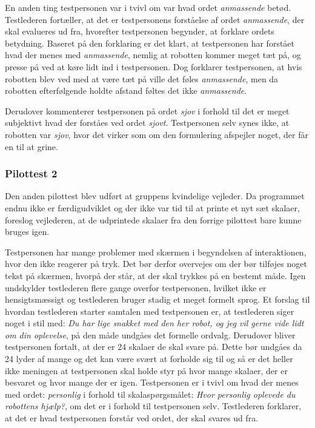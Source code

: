 En anden ting testpersonen var i tvivl om var hvad ordet \textit{anmassende} betød. Testlederen fortæller, at det er testpersonens forståelse af ordet \textit{anmassende}, der skal evalueres ud fra, hvorefter testpersonen begynder, at forklare ordets betydning. Baseret på den forklaring er det klart, at testpersonen har forstået hvad der menes med \textit{anmassende}, nemlig at robotten kommer meget tæt på, og presse på ved at køre lidt ind i testpersonen. Dog forklarer testpersonen, at hvis robotten blev ved med at være tæt på ville det føles \textit{anmassende}, men da robotten efterfølgende holdte afstand føltes det ikke \textit{anmassende}.

Derudover kommenterer testpersonen på ordet \textit{sjov} i forhold til det er meget subjektivt hvad der forståes ved ordet \textit{sjovt}. Testpersonen selv synes ikke, at robotten var \textit{sjov}, hvor det virker som om den formulering afspejler noget, der får en til at grine.

\subsubsection*{Pilottest 2}
\label{TestAfSkalaerPilot2}
%
Den anden pilottest blev udført at gruppens kvindelige vejleder. Da programmet endnu ikke er færdigudviklet og der ikke var tid til at printe et nyt sæt skalaer, foreslog vejlederen, at de udprintede skalaer fra den forrige pilottest bare kunne bruges igen. 

Testpersonen har mange problemer med skærmen i begyndelsen af interaktionen, hvor den ikke reagerer på tryk. Det bør derfor overvejes om der bør tilføjes noget tekst på skærmen, hvorpå der står, at der skal trykkes på en bestemt måde. Igen undskylder testlederen flere gange overfor testpersonen, hvilket ikke er hensigtsmæssigt og testlederen bruger stadig et meget formelt sprog. Et forslag til hvordan testlederen starter samtalen med testpersonen er, at testlederen siger noget i stil med: \textit{Du har lige snakket med den her robot, og jeg vil gerne vide lidt om din oplevelse}, på den måde undgåes det formelle ordvalg. Derudover bliver testpersonen fortalt, at der er 24 skalaer de skal svare på. Dette bør undgåes da 24 lyder af mange og det kan være svært at forholde sig til og så er det heller ikke meningen at testpersonen skal holde styr på hvor mange skalaer, der er besvaret og hvor mange der er igen.\blankline     
%
Testpersonen er i tvivl om hvad der menes med ordet: \textit{personlig} i forhold til skalaspørgsmålet: \textit{Hvor personlig oplevede du robottens hjælp?}, om det er i forhold til testpersonen selv. Testlederen forklarer, at det er hvad testpersonen forstår ved ordet, der skal svares ud fra.

